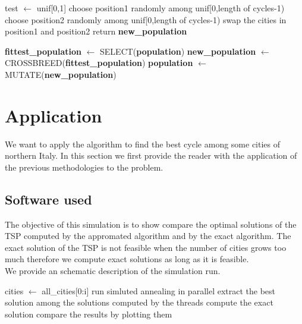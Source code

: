 \documentclass{article}
\begin{document}
\begin{algorithm}[H]
    \begin{algorithmic}[1]
        \State test $\leftarrow$ unif[0,1]
        	\State choose position1 randomly among unif[0,length of cycles-1)
  			\State choose position2 randomly among unif[0,length of cycles-1)
  			\State swap the cities in position1 and position2
        \EndIf
       \EndFor
        \State return \textbf{new\_population}
       \EndFunction
\end{algorithmic}
\end{algorithm}


\begin{algorithm}[H]
    \begin{algorithmic}[1]
        \State \textbf{fittest\_population} $\leftarrow$ SELECT(\textbf{population})
        \State \textbf{new\_population} $\leftarrow$ CROSSBREED(\textbf{fittest\_population})
       \State \textbf{population} $\leftarrow$ MUTATE(\textbf{new\_population})
       \EndFunction
\end{algorithmic}
\end{algorithm}

\section{Application} 
We want to apply the algorithm to find the best cycle among some cities of northern Italy.
In this section we first provide the reader with the application of the previous methodologies to the problem. 

\subsection{Software used}
The objective of this simulation is to show compare the optimal solutions of the TSP computed by the appromated algorithm and by the exact algorithm. The exact solution of the TSP is not feasible when the number of cities grows too much therefore we compute exact solutions as long as it is feasible. \\
We provide an schematic description of the simulation run. 
\begin{algorithm}[H]
    \begin{algorithmic}[1]
       	\State  cities $\leftarrow$ all\_cities[0:i]
       		\State run simluted annealing in parallel
       	\EndFor 
       	\State extract the best solution among the solutions computed by the threads
       		\State compute the exact solution
       	\EndIf
       	\State compare the results by plotting them
       \EndFor
       \EndFunction
\end{algorithmic}
\end{algorithm}
\end{document}
